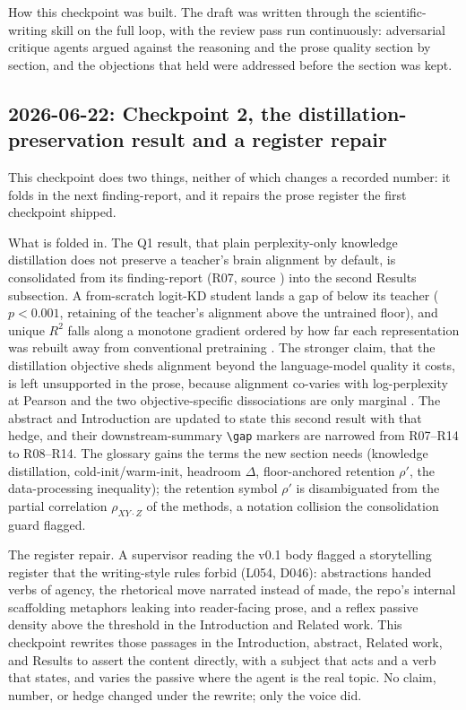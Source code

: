 How this checkpoint was built.
The draft was written through the scientific-writing skill on the full loop, with the review pass run continuously: adversarial critique agents argued against the reasoning and the prose quality section by section, and the objections that held were addressed before the section was kept.

\subsection*{2026-06-22: Checkpoint 2, the distillation-preservation result and a register repair}

This checkpoint does two things, neither of which changes a recorded number: it folds in the next finding-report, and it repairs the prose register the first checkpoint shipped.

What is folded in.
The Q1 result, that plain perplexity-only knowledge distillation does not preserve a teacher's brain alignment by default, is consolidated from its finding-report (R07, source ) into the second Results subsection.
A from-scratch logit-KD student lands a gap of  below its teacher ($p<0.001$, retaining  of the teacher's alignment above the untrained floor), and unique $R^2$ falls along a monotone gradient ordered by how far each representation was rebuilt away from conventional pretraining .
The stronger claim, that the distillation objective sheds alignment beyond the language-model quality it costs, is left unsupported in the prose, because alignment co-varies with log-perplexity at Pearson  and the two objective-specific dissociations are only marginal .
The abstract and Introduction are updated to state this second result with that hedge, and their downstream-summary \verb|\gap| markers are narrowed from R07--R14 to R08--R14.
The glossary gains the terms the new section needs (knowledge distillation, cold-init/warm-init, headroom $\Delta$, floor-anchored retention $\rho'$, the data-processing inequality); the retention symbol $\rho'$ is disambiguated from the partial correlation $\rho_{XY\cdot Z}$ of the methods, a notation collision the consolidation guard flagged.

The register repair.
A supervisor reading the v0.1 body flagged a storytelling register that the writing-style rules forbid (L054, D046): abstractions handed verbs of agency, the rhetorical move narrated instead of made, the repo's internal scaffolding metaphors leaking into reader-facing prose, and a reflex passive density above the threshold in the Introduction and Related work.
This checkpoint rewrites those passages in the Introduction, abstract, Related work, and Results to assert the content directly, with a subject that acts and a verb that states, and varies the passive where the agent is the real topic.
No claim, number, or hedge changed under the rewrite; only the voice did.

